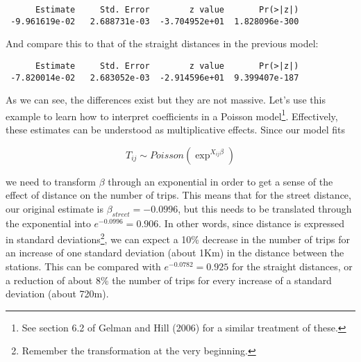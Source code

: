 \documentclass[
  letterpaper,
  krantz2]{style/krantz}
\newenvironment{Shaded}{\begin{snugshade}}{\end{snugshade}}
\newcommand{\FunctionTok}[1]{\textcolor[rgb]{0.28,0.35,0.67}{#1}}
\newcommand{\NormalTok}[1]{\textcolor[rgb]{0.00,0.23,0.31}{#1}}
\newcommand{\SpecialCharTok}[1]{\textcolor[rgb]{0.37,0.37,0.37}{#1}}
\newcommand{\StringTok}[1]{\textcolor[rgb]{0.13,0.47,0.30}{#1}}
\begin{document}
\begin{Shaded}
\end{Shaded}

\begin{verbatim}
      Estimate     Std. Error        z value       Pr(>|z|) 
 -9.961619e-02   2.688731e-03  -3.704952e+01  1.828096e-300 
\end{verbatim}

And compare this to that of the straight distances in the previous
model:

\begin{Shaded}
\end{Shaded}

\begin{verbatim}
      Estimate     Std. Error        z value       Pr(>|z|) 
 -7.820014e-02   2.683052e-03  -2.914596e+01  9.399407e-187 
\end{verbatim}

As we can see, the differences exist but they are not massive. Let's use
this example to learn how to interpret coefficients in a Poisson
model\footnote{See section 6.2 of Gelman and Hill (2006) for a similar
  treatment of these.}. Effectively, these estimates can be understood
as multiplicative effects. Since our model fits

\[
T_{ij} \sim Poisson (\exp^{X_{ij}\beta})
\]

we need to transform \(\beta\) through an exponential in order to get a
sense of the effect of distance on the number of trips. This means that
for the street distance, our original estimate is
\(\beta_{street} = -0.0996\), but this needs to be translated through
the exponential into \(e^{-0.0996} = 0.906\). In other words, since
distance is expressed in standard deviations\footnote{Remember the
  transformation at the very beginning.}, we can expect a 10\% decrease
in the number of trips for an increase of one standard deviation (about
1Km) in the distance between the stations. This can be compared with
\(e^{-0.0782} = 0.925\) for the straight distances, or a reduction of
about 8\% the number of trips for every increase of a standard deviation
(about 720m).
\end{document}
